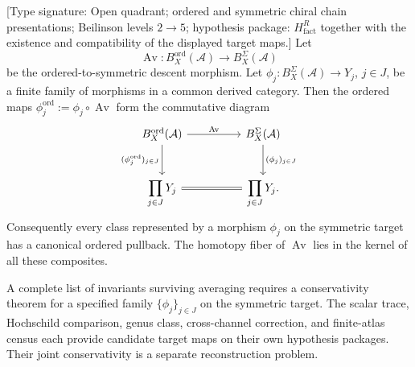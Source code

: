 \documentclass[11pt]{memoir}
\newcommand{\cA}{\mathcal{A}}
\begin{document}
\begin{theorem}
\label{thm:final-surviving-invariants-diagram}
\textup{[Type signature: Open quadrant; ordered and symmetric chiral
chain presentations; Beilinson levels \(2\to5\); hypothesis package:
\(H_{\mathrm{fact}}^R\) together with the existence and compatibility
of the displayed target maps.]}
Let
\[
 \operatorname{Av}\colon
 B_X^{\mathrm{ord}}(\cA)\longrightarrow B_X^\Sigma(\cA)
\]
be the ordered-to-symmetric descent morphism.  Let
\(\phi_j\colon B_X^\Sigma(\cA)\to Y_j\), \(j\in J\), be a finite
family of morphisms in a common derived category.  Then the ordered
maps \(\phi_j^{\mathrm{ord}}:=\phi_j\circ\operatorname{Av}\) form the
commutative diagram
\[
\begin{tikzcd}[column sep=huge,row sep=large]
B_X^{\mathrm{ord}}(\cA)
  \arrow[r,"\operatorname{Av}"]
  \arrow[d,"(\phi_j^{\mathrm{ord}})_{j\in J}"']
&
B_X^\Sigma(\cA)
  \arrow[d,"(\phi_j)_{j\in J}"]
\\
\displaystyle\prod_{j\in J}Y_j
  \arrow[r,equal]
&
\displaystyle\prod_{j\in J}Y_j .
\end{tikzcd}
\]
Consequently every class represented by a morphism
\(\phi_j\) on the symmetric target has a canonical ordered pullback.
The homotopy fiber of \(\operatorname{Av}\) lies in the kernel of all
these composites.
\end{theorem}

\begin{remark}
A complete list of invariants surviving averaging requires a
conservativity theorem for a specified family
\(\{\phi_j\}_{j\in J}\) on the symmetric target.  The scalar trace,
Hochschild comparison, genus class, cross-channel correction, and
finite-atlas census each provide candidate target maps on their own
hypothesis packages.  Their joint conservativity is a separate
reconstruction problem.
\end{remark}

\end{document}
